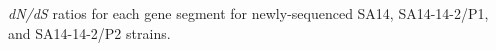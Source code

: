 \documentclass{report}
\begin{document}
\begin{table}[h]
	\centering
	\begin{ThreePartTable}

	\caption{\emph{dN/dS} ratios for each gene segment for newly-sequenced 
		SA14, SA14-14-2/P1, and SA14-14-2/P2 strains.}

	\label{my-label}
	
	\begin{tablenotes}
	\item[]
	\end{tablenotes}
	\end{ThreePartTable}
\end{table}
\end{document}
